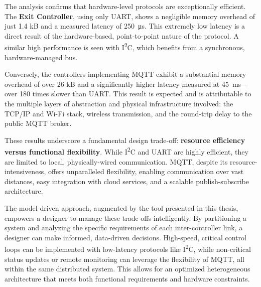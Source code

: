 The analysis confirms that hardware-level protocols are exceptionally efficient. The \textbf{Exit Controller}, using only UART, shows a negligible memory overhead of just 1.4 kB and a measured latency of \SI{250}{\micro\second}. This extremely low latency is a direct result of the hardware-based, point-to-point nature of the protocol. A similar high performance is seen with I\textsuperscript{2}C, which benefits from a synchronous, hardware-managed bus.

Conversely, the controllers implementing MQTT exhibit a substantial memory overhead of over 26 kB and a significantly higher latency measured at \SI{45}{\milli\second}—over 180 times slower than UART. This result is expected and is attributable to the multiple layers of abstraction and physical infrastructure involved: the TCP/IP and Wi-Fi stack, wireless transmission, and the round-trip delay to the public MQTT broker.

These results underscore a fundamental design trade-off: \textbf{resource efficiency versus functional flexibility}. While I\textsuperscript{2}C and UART are highly efficient, they are limited to local, physically-wired communication. MQTT, despite its resource-intensiveness, offers unparalleled flexibility, enabling communication over vast distances, easy integration with cloud services, and a scalable publish-subscribe architecture.

The model-driven approach, augmented by the tool presented in this thesis, empowers a designer to manage these trade-offs intelligently. By partitioning a system and analyzing the specific requirements of each inter-controller link, a designer can make informed, data-driven decisions. High-speed, critical control loops can be implemented with low-latency protocols like I\textsuperscript{2}C, while non-critical status updates or remote monitoring can leverage the flexibility of MQTT, all within the same distributed system. This allows for an optimized heterogeneous architecture that meets both functional requirements and hardware constraints.




